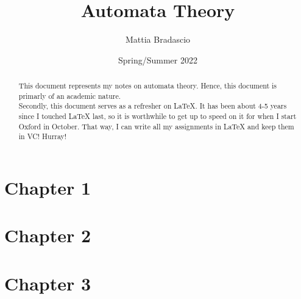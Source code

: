\documentclass[12pt, letterpaper]{article}
\title{Automata Theory}
\author{Mattia Bradascio}
\date{Spring/Summer 2022}
\begin{document}
\begin{titlepage}
\maketitle
\end{titlepage}

\begin{abstract}

    This document represents my notes on automata theory.
    Hence, this document is primarly of an academic nature. \\ 
    \indent Secondly, this document serves as a refresher on LaTeX. 
    It has been about 4-5 years since I touched LaTeX last,
    so it is worthwhile to get up to speed on it for when I start Oxford in October.
    That way, I can write all my assignments in LaTeX and keep them in VC! Hurray!

\end{abstract}

\section{Chapter 1}


\section{Chapter 2}


\section{Chapter 3}

\end{document}
